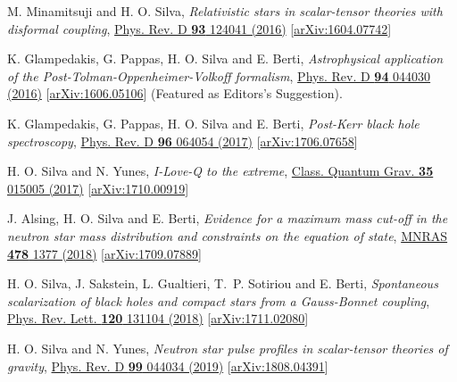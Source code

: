 \documentclass[10pt]{article}
\begin{document}
\begin{bibenum}
    \item M. Minamitsuji and H. O. Silva,
    \emph{Relativistic stars in scalar-tensor theories with disformal coupling},
    \href{http://journals.aps.org/prd/abstract/10.1103/PhysRevD.93.124056}{Phys. Rev. D {\bf93} 124041 (2016)}
    [\href{https://arxiv.org/abs/1604.07742}{arXiv:1604.07742}]
    \label{itm:disformal}

    \item K. Glampedakis, G. Pappas, H. O. Silva and E. Berti,
    \emph{Astrophysical application of the Post-Tolman-Oppenheimer-Volkoff formalism},
    \href{http://journals.aps.org/prd/abstract/10.1103/PhysRevD.94.044030}{Phys. Rev. D {\bf94} 044030 (2016)}
    [\href{https://arxiv.org/abs/1606.05106}{arXiv:1606.05106}]
    (Featured as {\color{venetianred}\sc Editors's Suggestion}).
    \label{itm:astroptov}

    \item K. Glampedakis, G. Pappas, H. O. Silva and E. Berti,
    \emph{Post-Kerr black hole spectroscopy},
    \href{https://journals.aps.org/prd/abstract/10.1103/PhysRevD.96.064054}{Phys. Rev. D {\bf96} 064054 (2017)}
    [\href{https://arxiv.org/abs/1706.07658}{arXiv:1706.07658}]
    \label{itm:postkerr}

    \item H. O. Silva and N. Yunes,
    \emph{I-Love-Q to the extreme},
    \href{http://iopscience.iop.org/article/10.1088/1361-6382/aa995a}{Class. Quantum Grav. {\bf35} 015005 (2017)}
    [\href{https://arxiv.org/abs/1710.00919}{arXiv:1710.00919}]

    \item J. Alsing, H. O. Silva and E. Berti,
    \emph{Evidence for a maximum mass cut-off in the neutron star mass distribution and constraints on the equation of state},
    \href{https://academic.oup.com/mnras/article-abstract/478/1/1377/4987228?redirectedFrom=fulltext}{MNRAS {\bf478} 1377 (2018)}
    [\href{https://arxiv.org/abs/1709.07889}{arXiv:1709.07889}]

    \item H. O. Silva, J. Sakstein, L. Gualtieri, T.~P. Sotiriou and E. Berti,
    \emph{Spontaneous scalarization of black holes and compact stars from a Gauss-Bonnet coupling},
    \href{https://journals.aps.org/prl/abstract/10.1103/PhysRevLett.120.131104}{Phys. Rev. Lett. {\bf120} 131104 (2018)}
    [\href{https://arxiv.org/abs/1711.02080}{arXiv:1711.02080}]
    \label{itm:edgb_sca}

    \item H. O. Silva and N. Yunes,
    \emph{Neutron star pulse profiles in scalar-tensor theories of gravity},
    \href{http://iopscience.iop.org/article/10.1088/1361-6382/aa995a}{Phys. Rev. D {\bf99} 044034 (2019)}
    [\href{https://arxiv.org/abs/1808.04391}{arXiv:1808.04391}]


\end{bibenum}
\end{document}
